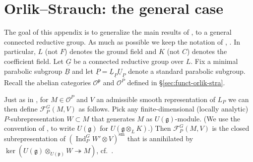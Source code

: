 \documentclass[a4paper]{amsart}
\numberwithin{equation}{section}
\theoremstyle{remark}
\theoremstyle{definition}
\DeclareMathOperator{\Ind}{Ind}
\newcommand{\Z}{\mathbb{Z}}
\newcommand{\Q}{\mathbb{Q}}
\newcommand{\sm}{\mathrm{sm}}
\newcommand{\alggrp}[1]{\underline{#1}}
\newcommand{\red}{\mathrm{red}}
\newcommand{\onto}{\twoheadrightarrow}
\begin{document}
\appendix
\newcommand{\Phir}{\Phi_{\red}}
\newcommand{\vp}{\varphi}
\newcommand{\cB}{\mathcal{B}}
\newcommand{\p}{\mathfrak p}
\newcommand{\cO}{\mathcal{O}}
\newcommand{\g}{\mathfrak g}
\newcommand{\copp}{\cO^{\p}}
\newcommand{\cop}{\cO^{P}}
\newcommand{\col}{\cO^{L_P}}
\newcommand{\coll}{\cO^{\mathfrak l_P}}
\newcommand{\z}{\mathfrak z}
\newcommand{\h}{\mathfrak h}
\newcommand{\m}{\mathfrak m}
\newcommand{\qp}{{\Q_p}}
\newcommand{\cH}{\mathcal{H}}
\newcommand{\zp}{\Z_p}
\newcommand{\del}{\mathfrak d}
\newcommand{\q}{\mathfrak q}
\newcommand{\cF}{\mathcal{F}}

\renewcommand{\b}{\mathfrak b}
\renewcommand{\u}{\mathfrak u}
\renewcommand{\t}{\mathfrak t}
\renewcommand{\l}{\mathfrak l}

\section{Orlik--Strauch: the general case}
\label{app:orlik-strauch}

The goal of this appendix is to generalize the main results of \cite{OS2}, \cite{OS3} to a general connected reductive group.
As much as possible we keep the notation of \cite{OS2}, \cite{OS3}. In particular, $L$ (not $F$) denotes the ground field and $K$ (not $C$) denotes the coefficient field.
Let $\alggrp G$ be a connected reductive group over $L$.
Fix a minimal parabolic subgroup $\alggrp B$ and let $\alggrp P = \alggrp L_{\alggrp P} \alggrp U_{\alggrp P}$ denote a standard parabolic subgroup.
Recall the abelian categories $\copp$ and $\cop$ defined in \S\ref{sec:funct-orlik-stra}.

Just as in \cite{OS3}, for $M \in \cop$ and $V$ an admissible smooth representation of $L_P$ we can then define $\cF_P^G(M,V)$ as follows.
Pick any finite-dimensional (locally analytic) $P$-subrepresentation $W \subset M$ that generates $M$ as $U(\g)$-module.
(We use the convention of \cite{OS2}, \cite{OS3} to write $U(\g)$ for $U(\g \otimes_L K)$.)
Then $\cF_P^G(M,V)$ is the closed subrepresentation of $(\Ind_P^G W' \otimes V)^\sm$ that is annihilated by $\ker(U(\g)\otimes_{U(\p)} W \onto M)$, cf.\ \cite[\S3.8]{OS3}.
\end{document}
